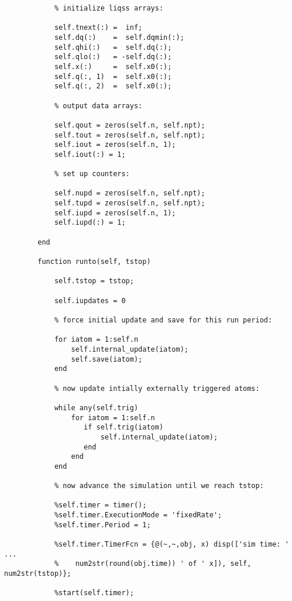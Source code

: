 \begin{lstlisting}
            % initialize liqss arrays:
            
            self.tnext(:) =  inf;
            self.dq(:)    =  self.dqmin(:);
            self.qhi(:)   =  self.dq(:); 
            self.qlo(:)   = -self.dq(:);
            self.x(:)     =  self.x0(:);
            self.q(:, 1)  =  self.x0(:);
            self.q(:, 2)  =  self.x0(:);

            % output data arrays:
            
            self.qout = zeros(self.n, self.npt);
            self.tout = zeros(self.n, self.npt);
            self.iout = zeros(self.n, 1);
            self.iout(:) = 1;
            
            % set up counters:
            
            self.nupd = zeros(self.n, self.npt);
            self.tupd = zeros(self.n, self.npt);  
            self.iupd = zeros(self.n, 1);
            self.iupd(:) = 1;
            
        end 
        
        function runto(self, tstop)
            
            self.tstop = tstop;
            
            self.iupdates = 0
            
            % force initial update and save for this run period:
            
            for iatom = 1:self.n
                self.internal_update(iatom);
                self.save(iatom);
            end 
            
            % now update intially externally triggered atoms:
            
            while any(self.trig)
                for iatom = 1:self.n
                   if self.trig(iatom)
                       self.internal_update(iatom);
                   end
                end 
            end
            
            % now advance the simulation until we reach tstop:
            
            %self.timer = timer();
            %self.timer.ExecutionMode = 'fixedRate';
            %self.timer.Period = 1;
            
            %self.timer.TimerFcn = {@(~,~,obj, x) disp(['sim time: ' ...
            %    num2str(round(obj.time)) ' of ' x]), self, num2str(tstop)};
            
            %start(self.timer);
            

\end{lstlisting}
